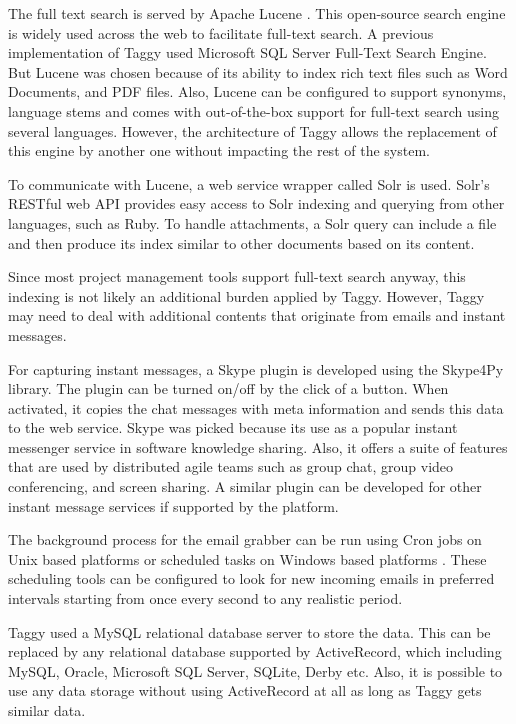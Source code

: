The full text search is served by Apache Lucene \cite{lucene}. This open-source search engine is widely used across the web to facilitate full-text search. A previous implementation of Taggy used Microsoft SQL Server Full-Text Search Engine\cite{auto_tagging}\cite{sql_server}. But Lucene was chosen because of its ability to index rich text files such as Word Documents, and PDF files. Also, Lucene can be configured to support synonyms, language stems and comes with out-of-the-box support for full-text search using several languages. However, the architecture of Taggy allows the replacement of this engine by another one without impacting the rest of the system.

To communicate with Lucene, a web service wrapper called Solr is used\cite{solr}. Solr's RESTful web API provides easy access to Solr indexing and querying from other languages, such as Ruby. To handle attachments, a Solr query can include a file and then produce its index similar to other documents based on its content.

Since most project management tools support full-text search anyway, this indexing is not likely an additional burden applied by Taggy. However, Taggy may need to deal with additional contents that originate from emails and instant messages.

For capturing instant messages, a Skype plugin is developed using the Skype4Py library\cite{skype4py}. The plugin can be turned on/off by the click of a button. When activated, it copies the chat messages with meta information and sends this data to the web service. Skype was picked because its use as a popular instant messenger service in software knowledge sharing\cite{how_did_we}. Also, it offers a suite of features that are used by distributed agile teams such as group chat, group video conferencing, and screen sharing. A similar plugin can be developed for other instant message services if supported by the platform.

The background process for the email grabber can be run using Cron jobs on Unix based platforms or scheduled tasks on Windows based platforms \cite{cron} \cite{scheduled_tasks}. These scheduling tools can be configured to look for new incoming emails in preferred intervals starting from once every second to any realistic period.

Taggy used a MySQL relational database server to store the data. This can be replaced by any relational database supported by ActiveRecord, which including MySQL, Oracle, Microsoft SQL Server, SQLite, Derby etc\cite{active_record}. Also, it is possible to use any data storage without using ActiveRecord at all as long as Taggy gets similar data.

